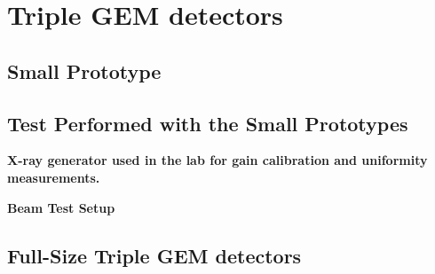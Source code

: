 
\def\baselinestretch{1}


\chapter{Triple GEM detectors}




\smallskip

\goodbreak
\section{Small Prototype}







\goodbreak
\section{Test Performed with the Small Prototypes}







\goodbreak
\textbf {X-ray generator used in the lab for gain calibration and uniformity measurements.}






\smallskip
\textbf {Beam Test Setup}







\smallskip

\goodbreak
\section{Full-Size Triple GEM detectors}






